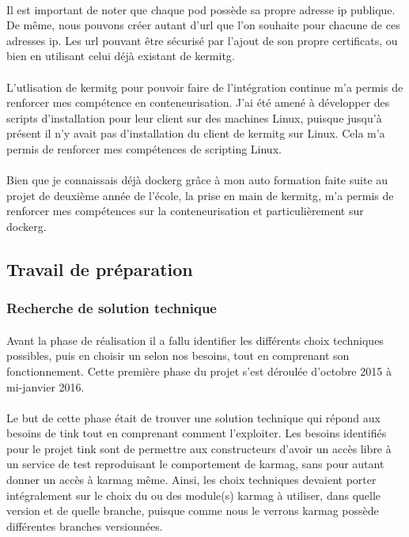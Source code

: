 \documentclass[12pt,a4paper]{report}
\begin{document}
\paragraph*{}Il est important de noter que chaque pod possède sa propre adresse \gls{ip} publique. De même, nous pouvons créer autant d'\gls{url} que l'on souhaite pour chacune de ces adresses \gls{ip}. Les \gls{url} pouvant être sécurisé par l'ajout de son propre certificats, ou bien en utilisant celui déjà existant de \gls{kermitg}. \paragraph*{}L'utlisation de \gls{kermitg} pour pouvoir faire de l'intégration continue m'a permis de renforcer mes compétence en conteneurisation. J’ai été amené à
développer des scripts d’installation pour leur client sur des machines Linux, puisque
jusqu’à présent il n’y avait pas d’installation du client de \gls{kermitg} sur Linux. Cela m’a permis de renforcer mes compétences de scripting Linux.
\paragraph*{}Bien que je connaissais déjà \gls{dockerg} grâce à mon auto formation faite suite au projet de deuxième année de l’école, la prise en main de \gls{kermitg}, m’a permis de renforcer mes compétences sur la conteneurisation et particulièrement sur \gls{dockerg}. \\
\subsection{Travail de préparation} 
\subsubsection{Recherche de solution technique}
\paragraph*{}Avant la phase de réalisation il a fallu identifier les différents choix techniques possibles, puis en choisir un selon nos besoins, tout en comprenant son fonctionnement. Cette première phase du projet s’est déroulée d’octobre 2015 à mi-janvier 2016.
\paragraph*{}Le but de cette phase était de trouver une solution technique qui répond
aux besoins de \gls{tink} tout en comprenant comment l’exploiter. Les besoins identifiés pour le projet \gls{tink} sont de permettre aux constructeurs d’avoir un accès libre à un service de test reproduisant le comportement de \gls{karmag}, sans pour autant donner un accès à \gls{karmag} même. Ainsi, les choix techniques devaient porter intégralement sur le choix du ou des module(s) \gls{karmag} à utiliser, dans quelle version et de quelle branche, puisque comme nous le verrons \gls{karmag} possède différentes branches versionnées.
\end{document}
